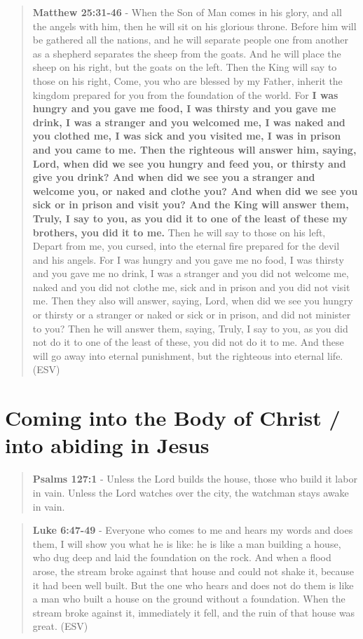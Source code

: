 \documentclass[11pt]{article}
\begin{document}
\begin{quote}
\textbf{Matthew 25:31-46} - When the Son of Man comes in his glory, and all the angels with him, then he will sit on his glorious throne. Before him will be gathered all the nations, and he will separate people one from another as a shepherd separates the sheep from the goats. And he will place the sheep on his right, but the goats on the left. Then the King will say to those on his right, Come, you who are blessed by my Father, inherit the kingdom prepared for you from the foundation of the world. For \textbf{I was hungry and you gave me food, I was thirsty and you gave me drink, I was a stranger and you welcomed me, I was naked and you clothed me, I was sick and you visited me, I was in prison and you came to me. Then the righteous will answer him, saying, Lord, when did we see you hungry and feed you, or thirsty and give you drink? And when did we see you a stranger and welcome you, or naked and clothe you? And when did we see you sick or in prison and visit you? And the King will answer them, Truly, I say to you, as you did it to one of the least of these my brothers, you did it to me.} Then he will say to those on his left, Depart from me, you cursed, into the eternal fire prepared for the devil and his angels. For I was hungry and you gave me no food, I was thirsty and you gave me no drink, I was a stranger and you did not welcome me, naked and you did not clothe me, sick and in prison and you did not visit me. Then they also will answer, saying, Lord, when did we see you hungry or thirsty or a stranger or naked or sick or in prison, and did not minister to you? Then he will answer them, saying, Truly, I say to you, as you did not do it to one of the least of these, you did not do it to me. And these will go away into eternal punishment, but the righteous into eternal life. (ESV)
\end{quote}

\section{Coming into the Body of Christ / into abiding in Jesus}
\label{sec:orgc910e0e}
\begin{quote}
\textbf{Psalms 127:1} - Unless the Lord builds the house, those who build it labor in vain. Unless the Lord watches over the city, the watchman stays awake in vain.
\end{quote}

\begin{quote}
\textbf{Luke 6:47-49} - Everyone who comes to me and hears my words and does them, I will show you what he is like: he is like a man building a house, who dug deep and laid the foundation on the rock. And when a flood arose, the stream broke against that house and could not shake it, because it had been well built. But the one who hears and does not do them is like a man who built a house on the ground without a foundation. When the stream broke against it, immediately it fell, and the ruin of that house was great. (ESV)
\end{quote}
\end{document}

